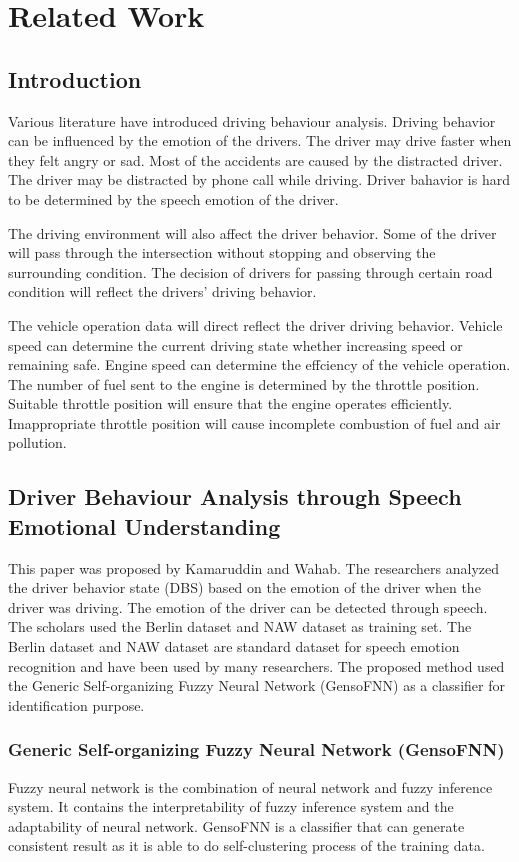 \chapter{Related Work}
\section{Introduction}
Various literature have introduced driving behaviour analysis. Driving behavior can be influenced by the emotion of the drivers. The driver may drive faster when they felt angry or sad. Most of the accidents are caused by the distracted driver. The driver may be distracted by phone call while driving. Driver bahavior is hard to be determined by the speech emotion of the driver.\cite{kamaruddin:wahab:2010}

The driving environment will also affect the driver behavior. Some of the driver will pass through the intersection without stopping and observing the surrounding condition. The decision of drivers for passing through certain road condition will reflect the drivers' driving behavior.

The vehicle operation data will direct reflect the driver driving behavior. Vehicle speed can determine the current driving state whether increasing speed or remaining safe. Engine speed can determine the effciency of the vehicle operation. The number of fuel sent to the engine is determined by the throttle position. Suitable throttle position will ensure that the engine operates efficiently. Imappropriate throttle position will cause incomplete combustion of fuel and air pollution.\cite{chen:pan:lu:2015}   

\section{Driver Behaviour Analysis through Speech Emotional Understanding}
This paper was proposed by Kamaruddin and Wahab\citeyear{kamaruddin:wahab:2010}. The researchers analyzed the driver behavior state (DBS) based on the emotion of the driver when the driver was driving. The emotion of the driver can be detected through speech. 
The scholars used the Berlin dataset and NAW dataset as training set. The Berlin dataset and NAW dataset are standard dataset for speech emotion recognition and have been used by many researchers.
The proposed method used the Generic Self-organizing Fuzzy Neural Network (GensoFNN) as a classifier for identification purpose. 
\subsection{Generic Self-organizing Fuzzy Neural Network (GensoFNN)}
Fuzzy neural network is the combination of neural network and fuzzy inference system. It contains the interpretability of fuzzy inference system and the adaptability of neural network. GensoFNN is a classifier that can generate consistent result as it is able to do self-clustering process of the training data.
